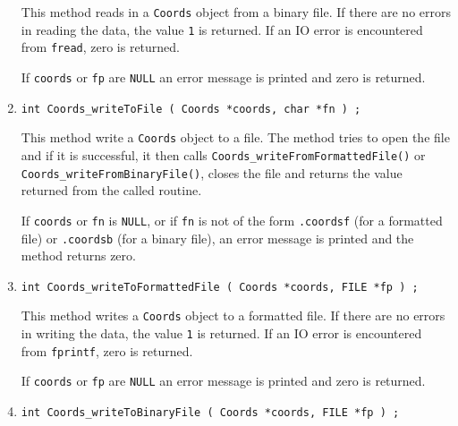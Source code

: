 \begin{enumerate}
\begin{verbatim}
\end{verbatim}
\par
This method reads in a {\tt Coords} object from a binary file.
If there are no errors in reading the data, 
the value {\tt 1} is returned.
If an IO error is encountered from {\tt fread}, zero is returned.
\par {}
If {\tt coords} or {\tt fp} are {\tt NULL} 
an error message is printed and zero is returned.
\item
\begin{verbatim}
int Coords_writeToFile ( Coords *coords, char *fn ) ;
\end{verbatim}
\par
This method write a {\tt Coords} object to a file.
The method tries to open the file and if it is successful, 
it then calls {\tt Coords\_writeFromFormattedFile()} or
{\tt Coords\_writeFromBinaryFile()},
closes the file
and returns the value returned from the called routine.
\par {}
If {\tt coords} or {\tt fn} is {\tt NULL}, 
or if {\tt fn} is not of the form
{\tt *.coordsf} (for a formatted file) 
or {\tt *.coordsb} (for a binary file),
an error message is printed and the method returns zero.
\item
\begin{verbatim}
int Coords_writeToFormattedFile ( Coords *coords, FILE *fp ) ;
\end{verbatim}
\par
This method writes a {\tt Coords} object to a formatted file.
If there are no errors in writing the data, 
the value {\tt 1} is returned.
If an IO error is encountered from {\tt fprintf}, zero is returned.
\par {}
If {\tt coords} or {\tt fp} are {\tt NULL} 
an error message is printed and zero is returned.
\item
\begin{verbatim}
int Coords_writeToBinaryFile ( Coords *coords, FILE *fp ) ;
\end{verbatim}

\end{enumerate}

